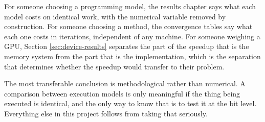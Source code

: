 For someone choosing a programming model, the results chapter says what each
model costs on identical work, with the numerical variable removed by
construction. For someone choosing a method, the convergence tables say what each
one costs in iterations, independent of any machine. For someone weighing a GPU,
Section \ref{sec:device-results} separates the part of the speedup that is the
memory system from the part that is the implementation, which is the separation
that determines whether the speedup would transfer to their problem.

The most transferable conclusion is methodological rather than numerical. A
comparison between execution models is only meaningful if the thing being
executed is identical, and the only way to know that is to test it at the bit
level. Everything else in this project follows from taking that seriously.
